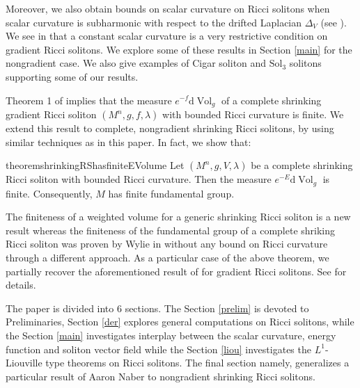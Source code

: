 \documentclass{amsart}
\newcommand{\derivative}{\mathrm{d}}
\DeclareMathOperator*{\Vol}{Vol}
\theoremstyle{plain}
\theoremstyle{plain}
\theoremstyle{plain}
\theoremstyle{plain}
\theoremstyle{remark}
\begin{document}
Moreover,  we also obtain bounds on scalar curvature on Ricci solitons when scalar curvature is subharmonic with respect to the drifted Laplacian $\Delta_V$ (see ). 
We see in \cite{MR2507581} that a constant scalar curvature is a very restrictive condition on gradient Ricci solitons.
We explore some of these results in 
Section \ref{main} for the nongradient case.
We also give examples of Cigar soliton and $\mbox{Sol}_3$ solitons  supporting  some of our results. 

Theorem 1 of \cite{naber2006geometryanalysisriccisolitons} implies that the measure $e^{-f} \derivative {\Vol}_g $ of a complete shrinking gradient Ricci soliton $(M^n,g,f,\lambda)$ with bounded Ricci curvature is finite. 
We extend this result to complete, nongradient shrinking Ricci solitons, by using similar techniques as in this paper. In fact, we show that:  
\begin{restatable}{theorem}{shrinkingRShasfiniteEVolume}
	\label{thm: bounded Ricci implies finite E volume}
	Let $(M^n,g,V,\lambda)$ be a complete shrinking Ricci soliton with bounded Ricci curvature. 
	Then the measure $e^{-E} \derivative {\Vol}_g$ is finite. Consequently,  $M$ has finite fundamental group.
\end{restatable}
The finiteness of a weighted volume for a generic shrinking Ricci soliton is a new result
whereas the finiteness of the fundamental group of a complete shriking Ricci soliton was proven by Wylie in \cite{MR2373611} without any bound on Ricci curvature through a different approach. 
As a particular case of the above theorem, we partially recover the aforementioned result of \cite{naber2006geometryanalysisriccisolitons} for gradient Ricci solitons. 
See  for details. 
 




The paper is divided into 6 sections. 
The Section \ref{prelim}  is devoted to Preliminaries, Section \ref{der} explores  general computations on  Ricci solitons, while the Section \ref{main} investigates interplay between the scalar curvature, energy function and soliton vector field while the Section \ref{liou} investigates the $L^1$-Liouville type theorems on Ricci solitons.
The final section namely,  generalizes a particular result of Aaron Naber \cite{naber2006geometryanalysisriccisolitons} to nongradient shrinking Ricci solitons. 
\end{document}
